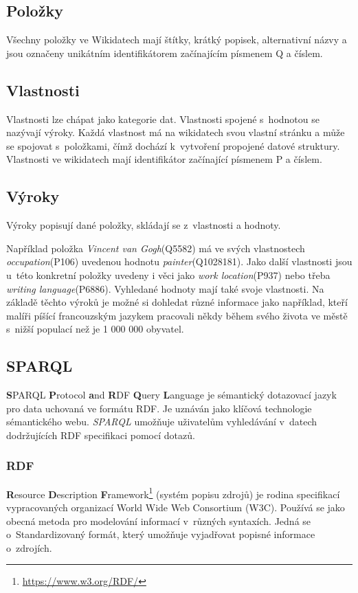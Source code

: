 \subsection*{Položky}
Všechny položky ve Wikidatech mají štítky, krátký popisek, alternativní názvy a jsou označeny unikátním identifikátorem začínajícím písmenem Q a číslem\cite{vrandevcic2014wikidata}.

\subsection*{Vlastnosti}

Vlastnosti lze chápat jako kategorie dat. Vlastnosti spojené s~hodnotou se nazývají výroky. Každá vlastnost má na wikidatech svou vlastní stránku a může se spojovat s~položkami, čímž dochází k~vytvoření propojené datové struktury. Vlastnosti ve wikidatech mají identifikátor začínající písmenem P a číslem\cite{vrandevcic2014wikidata}.


\subsection*{Výroky}

Výroky popisují dané položky, skládají se z~vlastnosti a hodnoty\cite{vrandevcic2014wikidata}.

Například položka \textit{Vincent van Gogh}(Q5582) má ve svých vlastnostech {\small\textit{occupation}(P106)} uvedenou hodnotu \textit{painter}(Q1028181). Jako další vlastnosti jsou u~této konkretní položky uvedeny i věci jako \textit{work location}(P937) nebo třeba \textit{writing language}(P6886). Vyhledané hodnoty mají také svoje vlastnosti. Na základě těchto výroků je možné si dohledat různé informace jako například, kteří malíři píšící francouzským jazykem pracovali někdy během svého života ve městě s~nižší populací než je 1 000 000 obyvatel.

\subsection*{SPARQL}
\textbf{S}PARQL \textbf{P}rotocol \textbf{a}nd \textbf{R}DF \textbf{Q}uery \textbf{L}anguage je sémantický dotazovací jazyk pro data uchovaná ve formátu RDF\cite{perez2009semantics}. Je uznáván jako klíčová technologie sémantického webu. \textit{SPARQL} umožňuje uživatelům vyhledávání v~datech dodržujících RDF specifikaci pomocí dotazů\cite{harris_seaborne_2013}\cite{cyganiak2005relational}.

\subsubsection*{RDF}
\textbf{R}esource \textbf{D}escription \textbf{F}ramework\footnote{\url{https://www.w3.org/RDF/}} (systém popisu zdrojů) je rodina specifikací vypracovaných organizací World Wide Web Consortium (W3C). Používá se jako obecná metoda pro modelování informací v~různých syntaxích. Jedná se o~Standardizovaný formát, který umožňuje vyjadřovat popisné informace o~zdrojích\cite{lassila1998resource}\cite{cyganiak2005relational}.

